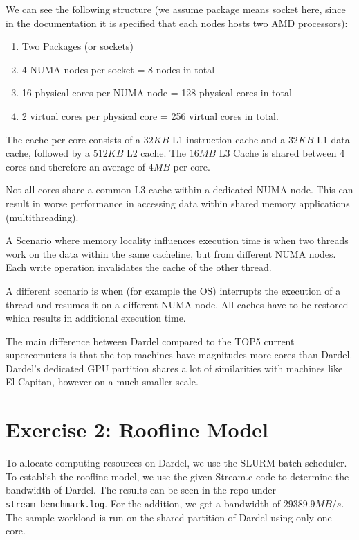 \documentclass[a4paper,10pt]{article}
\begin{document}
We can see the following structure (we assume package means socket here, since in the \href{https://www.pdc.kth.se/hpc-services/computing-systems/dardel-hpc-system/about-the-dardel-system-1.1053338#:~:text=Each%20node%20has%20two%20AMD%20EPYC™%C2%A0Zen2%202.25%20GHz%2064%2Dcore%20processors%2C%20which%20means%20that%20each%20compute%20node%20has%20a%20total%20of%20128%20physical%20CPU%20cores}{documentation} it is specified that each nodes hosts two AMD processors):
\begin{enumerate}
  \item Two Packages (or sockets)
  \item 4 NUMA nodes per socket = 8 nodes in total
  \item 16 physical cores per NUMA node = 128 physical cores in total
  \item 2 virtual cores per physical core = 256 virtual cores in total.
\end{enumerate}
The cache per core consists of a $32 KB$ L1 instruction cache and a $32 KB$ L1 data cache, followed by a $512 KB$ L2 cache. The $16 MB$ L3 Cache is shared between 4 cores and therefore an average of $4MB$ per core.

Not all cores share a common L3 cache within a dedicated NUMA node.
This can result in worse performance in accessing data within shared memory applications (multithreading).

A Scenario where memory locality influences execution time is when two threads work on the data within the same cacheline, but from different NUMA nodes.
Each write operation invalidates the cache of the other thread.

A different scenario is when (for example the OS) interrupts the execution of a thread and resumes it on a different NUMA node.
All caches have to be restored which results in additional execution time.

The main difference between Dardel compared to the TOP5 current supercomuters is that the top machines have magnitudes more cores than Dardel.
Dardel's dedicated GPU partition shares a lot of similarities with machines like El Capitan, however on a much smaller scale.

\section{Exercise 2: Roofline Model}
To allocate computing resources on Dardel, we use the SLURM batch scheduler. To establish the roofline
model, we use the given Stream.c code to determine the bandwidth of Dardel.  
The results can be seen in the repo under \verb|stream_benchmark.log|.
For the addition, we get a bandwidth of $29389.9 MB/s$.
The sample workload is run on the shared partition of Dardel using only one core. 
\end{document}

